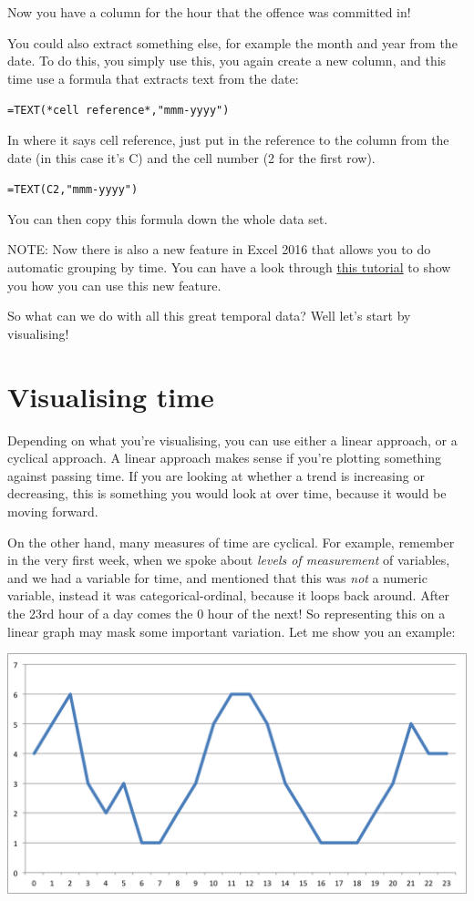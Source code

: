 \documentclass[]{book}
\theoremstyle{definition}
\theoremstyle{definition}
\theoremstyle{definition}
\theoremstyle{remark}
\begin{document}
Now you have a column for the hour that the offence was committed in!

You could also extract something else, for example the month and year
from the date. To do this, you simply use this, you again create a new
column, and this time use a formula that extracts text from the date:

\texttt{=TEXT(*cell\ reference*,"mmm-yyyy")}

In where it says cell reference, just put in the reference to the column
from the date (in this case it's C) and the cell number (2 for the first
row).

\texttt{=TEXT(C2,"mmm-yyyy")}

You can then copy this formula down the whole data set.

NOTE: Now there is also a new feature in Excel 2016 that allows you to
do automatic grouping by time. You can have a look through
\href{https://blogs.office.com/en-us/2015/10/13/time-grouping-enhancements-in-excel-2016/?eu=true}{this
tutorial} to show you how you can use this new feature.

So what can we do with all this great temporal data? Well let's start by
visualising!

\hypertarget{visualising-time}{%
\section{Visualising time}\label{visualising-time}}

Depending on what you're visualising, you can use either a linear
approach, or a cyclical approach. A linear approach makes sense if
you're plotting something against passing time. If you are looking at
whether a trend is increasing or decreasing, this is something you would
look at over time, because it would be moving forward.

On the other hand, many measures of time are cyclical. For example,
remember in the very first week, when we spoke about \emph{levels of
measurement} of variables, and we had a variable for time, and mentioned
that this was \emph{not} a numeric variable, instead it was
categorical-ordinal, because it loops back around. After the 23rd hour
of a day comes the 0 hour of the next! So representing this on a linear
graph may mask some important variation. Let me show you an example:

\includegraphics{imgs/time_line_ex.png}
\end{document}
